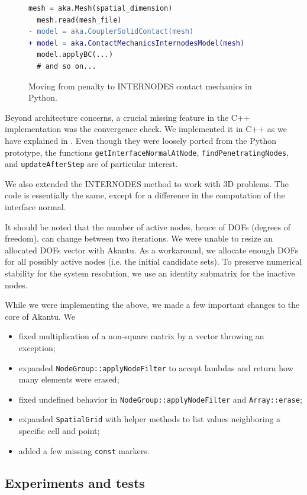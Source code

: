 \documentclass[11pt, a4paper]{article}
\begin{document}
\begin{figure}[!htb]
\centering
\begin{lstlisting}[language=diff]
  mesh = aka.Mesh(spatial_dimension)
  mesh.read(mesh_file)
- model = aka.CouplerSolidContact(mesh)
+ model = aka.ContactMechanicsInternodesModel(mesh)
  model.applyBC(...)
  # and so on...
\end{lstlisting}
\caption{Moving from penalty to INTERNODES contact mechanics in Python.}
\label{fig:pythondiff}
\end{figure}

Beyond architecture concerns, a crucial missing feature in the C++ implementation was the convergence check. We implemented it in C++ as we have explained in . Even though they were loosely ported from the Python prototype, the functions \texttt{getInterfaceNormalAtNode}, \texttt{findPenetratingNodes}, and \texttt{updateAfterStep} are of particular interest.

We also extended the INTERNODES method to work with 3D problems. The code is essentially the same, except for a difference in the computation of the interface normal.

It should be noted that the number of active nodes, hence of DOFs (degrees of freedom), can change between two iterations. We were unable to resize an allocated DOFs vector with Akantu. As a workaround, we allocate enough DOFs for all possibly active nodes (i.e. the initial candidate sets). To preserve numerical stability for the system resolution, we use an identity submatrix for the inactive nodes.

While we were implementing the above, we made a few important changes to the core of Akantu. We
\begin{itemize}
    \item fixed multiplication of a non-square matrix by a vector throwing an exception;
    \item expanded \texttt{NodeGroup::applyNodeFilter} to accept lambdas and return how many elements were erased;
    \item fixed undefined behavior in \texttt{NodeGroup::applyNodeFilter} and \texttt{Array::erase};
    \item expanded \texttt{SpatialGrid} with helper methods to list values neighboring a specific cell and point;
    \item added a few missing \texttt{const} markers.
\end{itemize}

\subsection{Experiments and tests}
\label{subsec:experiments}
\end{document}
